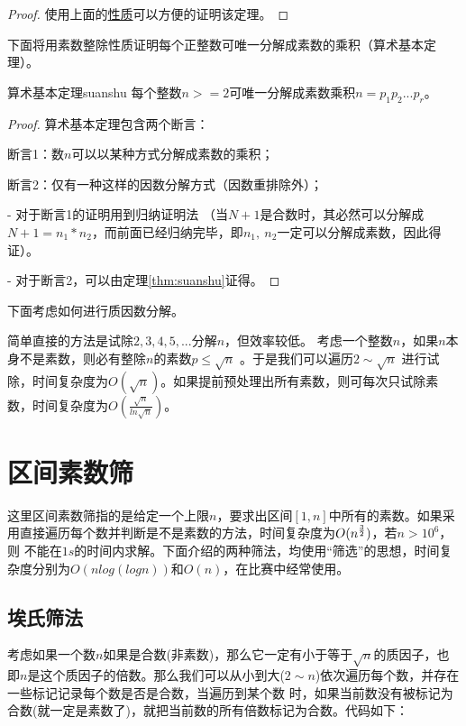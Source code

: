 \begin{proof}
	使用上面的\hyperref[pro:prime]{性质}可以方便的证明该定理。
\end{proof}

\vbox{}

下面将用{\heiti 素数整除性质}证明每个正整数可唯一分解成素数的乘积（算术基本定理）。

\begin{theorem}{算术基本定理}{suanshu}
	每个整数$n>=2$可唯一分解成素数乘积$n=p_1p_2...p_r$。
\end{theorem}

\begin{proof}
算术基本定理包含两个断言：

断言1：数$n$可以以某种方式分解成素数的乘积；

断言2：仅有一种这样的因数分解方式（因数重排除外）；

- 对于断言1的证明用到归纳证明法 （当$N+1$是合数时，其必然可以分解成$N+1=n_1*n_2$，而前面已经归纳完毕，即$n_1,\ n_2$一定可以分解成素数，因此得证）。

- 对于断言2，可以由定理\ref{thm:suanshu}证得。
\end{proof}

\vbox{}

下面考虑如何进行质因数分解。

简单直接的方法是试除$2,3,4,5,...$分解$n$，但效率较低。
考虑一个整数$n$，如果$n$本身不是素数，则必有整除$n$的素数$p\leqslant \sqrt{n}$ 。于是我们可以遍历$2\sim \sqrt{n}$
进行试除，时间复杂度为$O(\sqrt{n})$。如果提前预处理出所有素数，则可每次只试除素数，时间复杂度为$O(\frac{\sqrt{n}}{ln \sqrt{n}})$。



\section{区间素数筛}

这里区间素数筛指的是给定一个上限$n$，要求出区间$[1,n]$中所有的素数。如果采用直接遍历每个数并判断是不是素数的方法，时间复杂度为$O(n^{3\over2})$，若$n>10^6$，则
不能在$1s$的时间内求解。下面介绍的两种筛法，均使用“筛选”的思想，时间复杂度分别为$O(nlog(logn))$和$O(n)$，在比赛中经常使用。

\subsection{埃氏筛法}
考虑如果一个数$n$如果是合数(非素数)，那么它一定有小于等于$\sqrt{n}$的质因子，也即$n$是这个质因子的倍数。那么我们可以从小到大($2\sim n$)依次遍历每个数，并存在一些标记记录每个数是否是合数，当遍历到某个数
时，如果当前数没有被标记为合数(就一定是素数了)，就把当前数的所有倍数标记为合数。代码如下：

